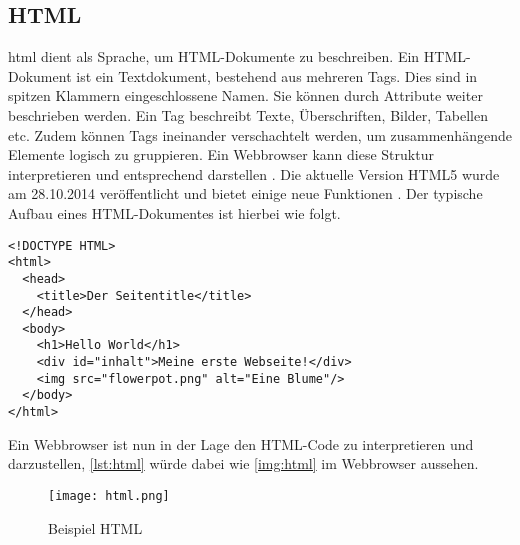 \subsection{HTML}
\label{html}
\ac{html} dient als Sprache, um HTML-Dokumente zu beschreiben. Ein HTML-Dokument ist ein Textdokument, bestehend aus mehreren Tags. Dies sind in spitzen Klammern eingeschlossene Namen. Sie können durch Attribute weiter beschrieben werden. Ein Tag beschreibt Texte, Überschriften, Bilder, Tabellen etc. Zudem können Tags ineinander verschachtelt werden, um zusammenhängende Elemente logisch zu gruppieren. Ein Webbrowser kann diese Struktur interpretieren und entsprechend darstellen \cite{lub07}. Die aktuelle Version HTML5 wurde am 28.10.2014 veröffentlicht und bietet einige neue Funktionen \cite{W3C2014}. Der typische Aufbau eines HTML-Dokumentes ist hierbei wie folgt.

\begin{lstlisting}[style=htmlcssjs, caption=Beispiel HTML, label=lst:html]
<!DOCTYPE HTML>
<html>
  <head>
    <title>Der Seitentitle</title>
  </head>
  <body>
    <h1>Hello World</h1>
    <div id="inhalt">Meine erste Webseite!</div>
    <img src="flowerpot.png" alt="Eine Blume"/>
  </body>
</html>
\end{lstlisting}

Ein Webbrowser ist nun in der Lage den HTML-Code zu interpretieren und darzustellen, \autoref{lst:html} würde dabei wie \autoref{img:html} im Webbrowser aussehen.

\begin{figure}[H]
    \begin{center}
        \texttt{[image: html.png]}
        \caption{Beispiel HTML}
        \label{img:html}
    \end{center}
\end{figure}